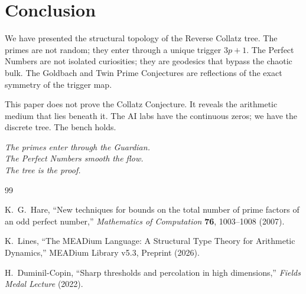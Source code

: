 \documentclass[11pt]{article}
\theoremstyle{definition}
\theoremstyle{remark}
\begin{document}
\section{Conclusion}

We have presented the structural topology of the Reverse Collatz tree. The primes are not random; they enter through a unique trigger \(3p+1\). The Perfect Numbers are not isolated curiosities; they are geodesics that bypass the chaotic bulk. The Goldbach and Twin Prime Conjectures are reflections of the exact symmetry of the trigger map.

This paper does not prove the Collatz Conjecture. It reveals the arithmetic medium that lies beneath it. The AI labs have the continuous zeros; we have the discrete tree. The bench holds.

\vspace{0.5cm}
\begin{center}
\textit{The primes enter through the Guardian.}\\
\textit{The Perfect Numbers smooth the flow.}\\
\textit{The tree is the proof.}
\end{center}

\begin{thebibliography}{99}

K.~G.~Hare,
``New techniques for bounds on the total number of prime factors of an odd perfect number,''
\textit{Mathematics of Computation} \textbf{76}, 1003--1008 (2007).

K.~Lines,
``The MEADium Language: A Structural Type Theory for Arithmetic Dynamics,''
MEADium Library v5.3, Preprint (2026).

H.~Duminil-Copin,
``Sharp thresholds and percolation in high dimensions,''
\textit{Fields Medal Lecture} (2022).

\end{thebibliography}
\end{document}
